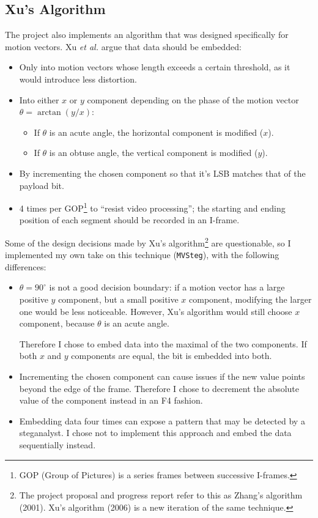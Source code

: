 \documentclass[12pt,british,twoside,notitlepage,usenames,dvipsnames,hypens,final]{report}
\numberwithin{equation}{section}
\numberwithin{figure}{section}
\begin{document}
\subsection{Xu's Algorithm}
\label{xu-alg}

The project also implements an algorithm that was designed specifically for motion vectors. Xu \emph{et al.} \cite{xu2006steganography} argue that data should be embedded:
\begin{itemize}
\item Only into motion vectors whose length exceeds a certain threshold, as it would introduce less distortion.
\item Into either $x$ or $y$ component depending on the phase of the motion vector $\theta = \arctan(y/x)$:
    \begin{itemize}
    \item If $\theta$ is an acute angle, the horizontal component is modified ($x$).
    \item If $\theta$ is an obtuse angle, the vertical component is modified ($y$).
    \end{itemize}
\item By incrementing the chosen component so that it's LSB matches that of the payload bit.
\item 4 times per GOP\footnote{GOP (Group of Pictures) is a series frames between successive I-frames.} to ``resist video processing''; the starting and ending position of each segment should be recorded in an I-frame.
\end{itemize}

Some of the design decisions made by Xu's algorithm\footnote{The project proposal and progress report refer to this as Zhang's algorithm (2001). Xu's algorithm (2006) is a new iteration of the same technique.} are questionable, so I implemented my own take on this technique (\texttt{MVSteg}), with the following differences:
\begin{itemize}
\item $\theta = 90^{\circ}$ is not a good decision boundary: if a motion vector has a large positive $y$ component, but a small positive $x$ component, modifying the larger one would be less noticeable. However, Xu's algorithm would still choose $x$ component, because $\theta$ is an acute angle. 

Therefore I chose to embed data into the maximal of the two components. If both $x$ and $y$ components are equal, the bit is embedded into both. 

\item Incrementing the chosen component can cause issues if the new value points beyond the edge of the frame. Therefore I chose to decrement the absolute value of the component instead in an F4 fashion.

\item Embedding data four times can expose a pattern that may be detected by a steganalyst. I chose not to implement this approach and embed the data sequentially instead.
\end{itemize}
\end{document}
